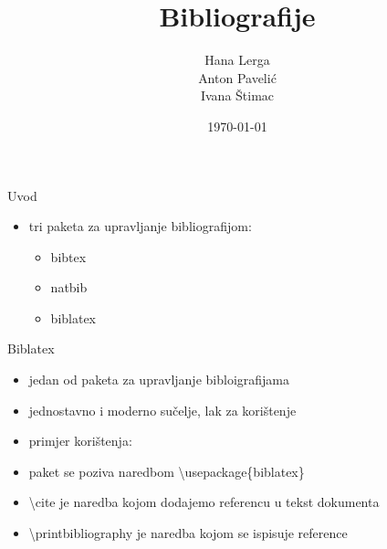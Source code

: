\documentclass{beamer}
\begin{document}
\title{Bibliografije}
\date{\today}
\author{Hana Lerga \\ Anton Pavelić \\ Ivana Štimac}

\begin{frame}
\maketitle
\end{frame}

\begin{frame}
\tableofcontents
\end{frame}


\begin{frame}{Uvod}
\begin{itemize}
	\item tri paketa za upravljanje bibliografijom:\\
	\begin{itemize}
		\item bibtex \\
		\item natbib \\
		\item biblatex \\
	\end{itemize}
\end{itemize}
	
\end{frame}

\begin{frame}{Biblatex}
\begin{itemize}
	\item jedan od paketa za upravljanje bibloigrafijama \\
	\item jednostavno i moderno sučelje, lak za korištenje \\
	\item primjer korištenja:
\end{itemize}
\end{frame}

\begin{frame}
\begin{itemize}
	\item paket se poziva naredbom \textbackslash usepackage\{biblatex\}\\
	\item \textbackslash cite je naredba kojom dodajemo referencu u tekst dokumenta \\
	\item \textbackslash printbibliography je naredba kojom se ispisuje reference \\
\end{itemize}
\end{frame}
\end{document}
